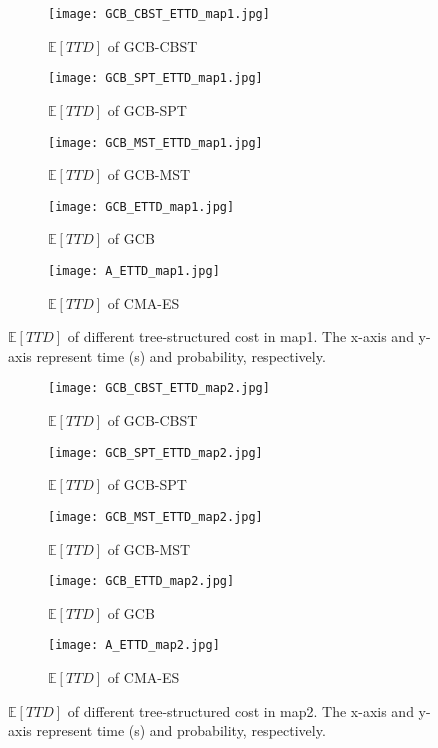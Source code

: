 \begin{figure}[htbp]
 \begin{center}
\begin{subfigure}{.30\textwidth}
  \centering
  \texttt{[image: GCB\_CBST\_ETTD\_map1.jpg]}
  \caption{$\mathbb{E}[TTD]$ of GCB-CBST}
\end{subfigure}
\begin{subfigure}{.30\textwidth}
  \centering
  \texttt{[image: GCB\_SPT\_ETTD\_map1.jpg]}
  \caption{$\mathbb{E}[TTD]$ of GCB-SPT}
\end{subfigure}
\begin{subfigure}{.30\textwidth}
  \centering
  \texttt{[image: GCB\_MST\_ETTD\_map1.jpg]}
  \caption{$\mathbb{E}[TTD]$ of GCB-MST}
\end{subfigure}
\begin{subfigure}{.30\textwidth}
  \centering
  \texttt{[image: GCB\_ETTD\_map1.jpg]}
  \caption{$\mathbb{E}[TTD]$ of GCB}
\end{subfigure}
\begin{subfigure}{.30\textwidth}
  \centering
  \texttt{[image: A\_ETTD\_map1.jpg]}
  \caption{$\mathbb{E}[TTD]$ of CMA-ES}
\end{subfigure}
\caption{$\mathbb{E}[TTD]$ of different tree-structured cost in map1. The x-axis and y-axis represent time (s) and probability, respectively.}
\label{fig:ETTD_map1}
 \end{center}
 \end{figure}

\begin{figure}[htbp]
 \begin{center}
\begin{subfigure}{.30\textwidth}
  \centering
  \texttt{[image: GCB\_CBST\_ETTD\_map2.jpg]}
  \caption{$\mathbb{E}[TTD]$ of GCB-CBST}
\end{subfigure}
\begin{subfigure}{.30\textwidth}
  \centering
  \texttt{[image: GCB\_SPT\_ETTD\_map2.jpg]}
  \caption{$\mathbb{E}[TTD]$ of GCB-SPT}
\end{subfigure}
\begin{subfigure}{.30\textwidth}
  \centering
  \texttt{[image: GCB\_MST\_ETTD\_map2.jpg]}
  \caption{$\mathbb{E}[TTD]$ of GCB-MST}
\end{subfigure}
\begin{subfigure}{.30\textwidth}
  \centering
  \texttt{[image: GCB\_ETTD\_map2.jpg]}
  \caption{$\mathbb{E}[TTD]$ of GCB}
\end{subfigure}
\begin{subfigure}{.30\textwidth}
  \centering
  \texttt{[image: A\_ETTD\_map2.jpg]}
  \caption{$\mathbb{E}[TTD]$ of CMA-ES}
\end{subfigure}
\caption{$\mathbb{E}[TTD]$ of different tree-structured cost in map2. The x-axis and y-axis represent time (s) and probability, respectively.}
\label{fig:ETTD_map2}
 \end{center}
 \end{figure}
\clearpage
